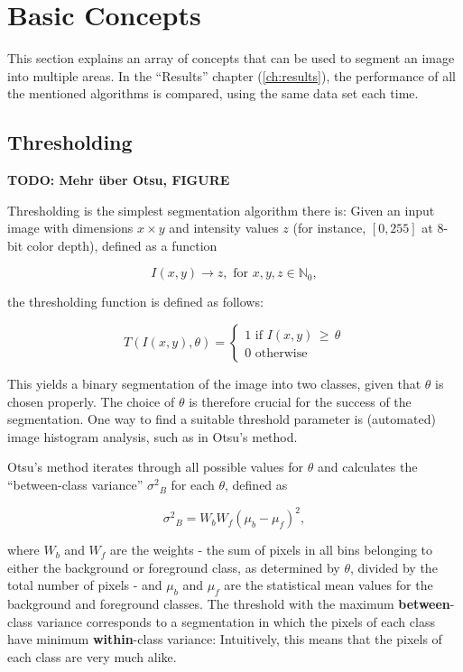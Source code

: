 \chapter{Basic Concepts}

This section explains an array of concepts that can be used to segment an image into multiple areas. In the ``Results'' chapter (\ref{ch:results}), the performance of all the mentioned algorithms is compared, using the same data set each time.
	
	\section{Thresholding}
\textbf{TODO: Mehr über Otsu, FIGURE}\\
\label{sec:thresholding}

Thresholding is the simplest segmentation algorithm there is: Given an input image with dimensions $x \times y$ and intensity values $z$ (for instance, $[0, 255]$ at 8-bit color depth), defined as a function 

\[I(x, y) \to z, \text{ for } x, y, z \in \mathbb{N}_0,\]

\noindent the thresholding function is defined as follows:

\[ T(I(x, y), \theta) =  \begin{cases}
				1 \text{ if } I(x, y) \, \geq \, \theta \\
			           0 \text{ otherwise}
			     \end{cases}
\]


\noindent This yields a binary segmentation of the image into two classes, given that $\theta$ is chosen properly. The choice of $\theta$ is therefore crucial for the success of the segmentation. One way to find a suitable threshold parameter is (automated) image histogram analysis, such as in Otsu's method.\cite{Otsu}

Otsu's method iterates through all possible values for $\theta$ and calculates the ``between-class variance'' ${\sigma^{2}}_B$ for each $\theta$, defined as

\[ {\sigma^2}_{B} = W_b W_f (\mu_b - \mu_f)^2,\]

\noindent where $W_b$ and $W_f$ are the weights - the sum of pixels in all bins belonging to either the background or foreground class, as determined by $\theta$, divided by the total number of pixels - and $\mu_b$ and $\mu_f$ are the statistical mean values for the background and foreground classes. The threshold with the maximum \textbf{between}-class variance corresponds to a segmentation in which the pixels of each class have minimum \textbf{within}-class variance: Intuitively, this means that the pixels of each class are very much alike.

